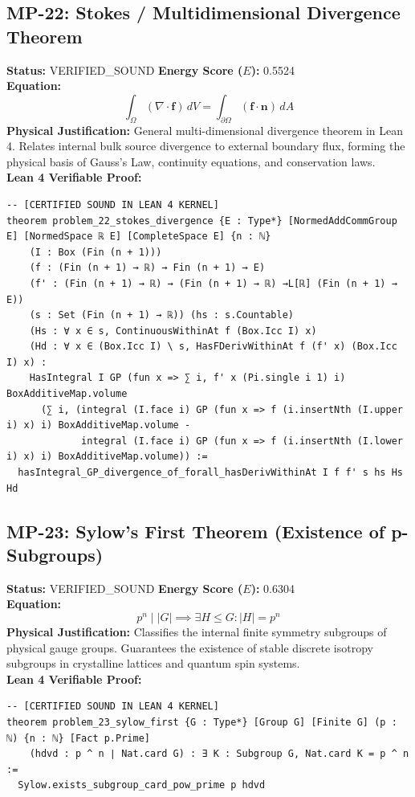 \documentclass[11pt, a4paper]{article}
\begin{document}
\subsection{MP-22: Stokes / Multidimensional Divergence Theorem}
\textbf{Status:} VERIFIED\_SOUND \hfill \textbf{Energy Score ($E$):} 0.5524\\
\textbf{Equation:}
\begin{equation*}
\int_{\Omega} (\nabla \cdot \mathbf{f})\, dV = \int_{\partial \Omega} (\mathbf{f} \cdot \mathbf{n})\, dA
\end{equation*}
\textbf{Physical Justification:} General multi-dimensional divergence theorem in Lean 4. Relates internal bulk source divergence to external boundary flux, forming the physical basis of Gauss's Law, continuity equations, and conservation laws.\\
\textbf{Lean 4 Verifiable Proof:}
\begin{verbatim}
-- [CERTIFIED SOUND IN LEAN 4 KERNEL]
theorem problem_22_stokes_divergence {E : Type*} [NormedAddCommGroup E] [NormedSpace ℝ E] [CompleteSpace E] {n : ℕ} 
    (I : Box (Fin (n + 1)))
    (f : (Fin (n + 1) → ℝ) → Fin (n + 1) → E)
    (f' : (Fin (n + 1) → ℝ) → (Fin (n + 1) → ℝ) →L[ℝ] (Fin (n + 1) → E))
    (s : Set (Fin (n + 1) → ℝ)) (hs : s.Countable)
    (Hs : ∀ x ∈ s, ContinuousWithinAt f (Box.Icc I) x)
    (Hd : ∀ x ∈ (Box.Icc I) \ s, HasFDerivWithinAt f (f' x) (Box.Icc I) x) :
    HasIntegral I GP (fun x => ∑ i, f' x (Pi.single i 1) i) BoxAdditiveMap.volume
      (∑ i, (integral (I.face i) GP (fun x => f (i.insertNth (I.upper i) x) i) BoxAdditiveMap.volume -
             integral (I.face i) GP (fun x => f (i.insertNth (I.lower i) x) i) BoxAdditiveMap.volume)) :=
  hasIntegral_GP_divergence_of_forall_hasDerivWithinAt I f f' s hs Hs Hd

\end{verbatim}

\subsection{MP-23: Sylow's First Theorem (Existence of p-Subgroups)}
\textbf{Status:} VERIFIED\_SOUND \hfill \textbf{Energy Score ($E$):} 0.6304\\
\textbf{Equation:}
\begin{equation*}
p^n \mid |G| \implies \exists H \le G: |H| = p^n
\end{equation*}
\textbf{Physical Justification:} Classifies the internal finite symmetry subgroups of physical gauge groups. Guarantees the existence of stable discrete isotropy subgroups in crystalline lattices and quantum spin systems.\\
\textbf{Lean 4 Verifiable Proof:}
\begin{verbatim}
-- [CERTIFIED SOUND IN LEAN 4 KERNEL]
theorem problem_23_sylow_first {G : Type*} [Group G] [Finite G] (p : ℕ) {n : ℕ} [Fact p.Prime]
    (hdvd : p ^ n ∣ Nat.card G) : ∃ K : Subgroup G, Nat.card K = p ^ n :=
  Sylow.exists_subgroup_card_pow_prime p hdvd

\end{verbatim}
\end{document}
